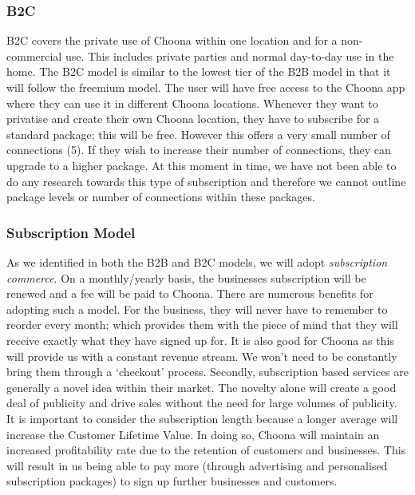 \subsubsection{B2C}
B2C covers the private use of Choona within one location and for a non-commercial use.  This includes private parties and normal day-to-day use in the home.  The B2C model is similar to the lowest tier of the B2B model in that it will follow the freemium model.  The user will have free access to the Choona app where they can use it in different Choona locations.  Whenever they want to privatise and create their own Choona location, they have to subscribe for a standard package; this will be free.  However this offers a very small number of connections (5).  If they wish to increase their number of connections, they can upgrade to a higher package.  At this moment in time, we have not been able to do any research towards this type of subscription and therefore we cannot outline package levels or number of connections within these packages.  \\

\subsubsection{Subscription Model}
As we identified in both the B2B and B2C models, we will adopt \emph{subscription commerce}.  On a monthly/yearly basis, the businesses subscription will be renewed and a fee will be paid to Choona.  There are numerous benefits for adopting such a model.  For the business, they will never have to remember to reorder every month; which provides them with the piece of mind that they will receive exactly what they have signed up for.  It is also good for Choona as this will provide us with a constant revenue stream.  We won't need to be constantly bring them through a `checkout' process. 
Secondly, subscription based services are generally a novel idea within their market.  The novelty alone will create a good deal of publicity and drive sales without the need for large volumes of publicity.  \\
It is important to consider the subscription length because a longer average will increase the Customer Lifetime Value.  In doing so, Choona will maintain an increased profitability rate due to the retention of customers and businesses.  This will result in us being able to pay more (through advertising and personalised subscription packages) to sign up further businesses and customers.\\
